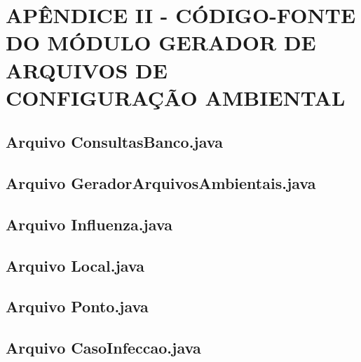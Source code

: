\section{APÊNDICE II - CÓDIGO-FONTE DO MÓDULO GERADOR DE ARQUIVOS DE CONFIGURAÇÃO AMBIENTAL}

\subsection{Arquivo ConsultasBanco.java}



\newpage

\subsection{Arquivo GeradorArquivosAmbientais.java}



\newpage

\subsection{Arquivo Influenza.java}



\newpage

\subsection{Arquivo Local.java}



\newpage

\subsection{Arquivo Ponto.java}



\newpage

\subsection{Arquivo CasoInfeccao.java}


